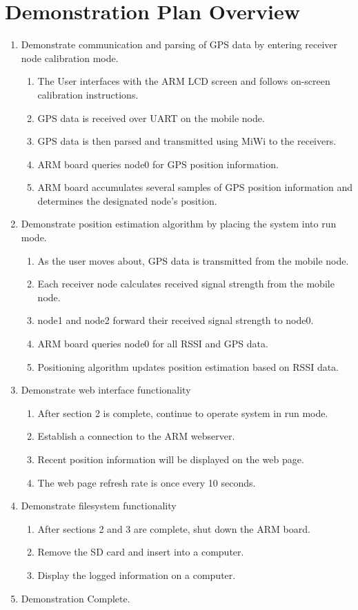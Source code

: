 \documentclass[10pt,letterpaper]{article}
\begin{document}
\section*{Demonstration Plan Overview}
\begin{enumerate}
\item Demonstrate communication and parsing of GPS data by entering receiver node calibration mode.
	\begin{enumerate}
	\item The User interfaces with the ARM LCD screen and follows on-screen calibration instructions.
	\item GPS data is received over UART on the mobile node.
	\item GPS data is then parsed and transmitted using MiWi to the receivers.
	\item ARM board queries node0 for GPS position information.
	\item ARM board accumulates several samples of GPS position information and determines the designated node's position.
	\end{enumerate}
\item Demonstrate position estimation algorithm by placing the system into run mode.
	\begin{enumerate}
	\item As the user moves about, GPS data is transmitted from the mobile node.
	\item Each receiver node calculates received signal strength from the mobile node.
	\item node1 and node2 forward their received signal strength to node0.
	\item ARM board queries node0 for all RSSI and GPS data.
	\item Positioning algorithm updates position estimation based on RSSI data.
	\end{enumerate}
\item Demonstrate web interface functionality
	\begin{enumerate}
	\item After section 2 is complete, continue to operate system in run mode.
	\item Establish a connection to the ARM webserver.
	\item Recent position information will be displayed on the web page.
	\item The web page refresh rate is once every 10 seconds.
	\end{enumerate}
\item Demonstrate filesystem functionality
	\begin{enumerate}
	\item After sections 2 and 3 are complete, shut down the ARM board.
	\item Remove the SD card and insert into a computer.
	\item Display the logged information on a computer.
	\end{enumerate}
\item Demonstration Complete.
\end{enumerate}
\end{document}
